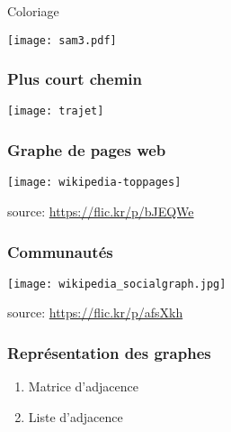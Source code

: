 \begin{frame}{Coloriage}
  \begin{minipage}{0.4\linewidth}
  \texttt{[image: sam3.pdf]}    
  \end{minipage}
  \begin{minipage}{0.58\linewidth}
  \end{minipage}

\end{frame}
\begin{frame}
  \frametitle{Plus court chemin}
\centering
  \texttt{[image: trajet]}
\end{frame}

\begin{frame}
  \frametitle{Graphe de pages web}
  \texttt{[image: wikipedia-toppages]}

  \hfill \tiny{source: \url{https://flic.kr/p/bJEQWe}}
\end{frame}

\begin{frame}
  \frametitle{Communautés}
  \texttt{[image: wikipedia\_socialgraph.jpg]}

  \hfill \tiny{source: \url{https://flic.kr/p/afsXkh}}
\end{frame}

\begin{frame}
  \frametitle{Représentation des graphes}
  \begin{enumerate}
  \item<1-> Matrice d'adjacence
  \item<2-> Liste d'adjacence 
  \end{enumerate}
\end{frame}

